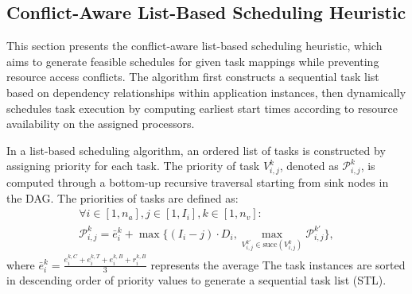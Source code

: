 \documentclass{IEEEtaes}
\begin{document}
\subsection{Conflict-Aware List-Based Scheduling Heuristic}
\label{subsec:schedule}
This section presents the conflict-aware list-based scheduling heuristic, which aims to generate feasible schedules for given task mappings while preventing resource access conflicts. The algorithm first constructs a sequential task list based on dependency relationships within application instances, then dynamically schedules task execution by computing earliest start times according to resource availability on the assigned processors. 

In a list-based scheduling algorithm, an ordered list of tasks is constructed by assigning priority for each task. The priority of task $V_{i,j}^{k}$, denoted as $\mathcal{P}_{i,j}^{k}$, is computed through a bottom-up recursive traversal starting from sink nodes in the DAG. The priorities of tasks are defined as:
\begin{multline}
    \forall i\in[1,n_a],j\in[1,I_i],k\in[1,n_v]:\\ \mathcal{P}_{i,j}^{k}=\bar{e}_{i}^{k}+\max\bigg\{(I_i-j)\cdot D_i,\max\limits_{V_{i,j}^{k'}\in \text{succ}(V_{i,j}^{k})}\mathcal{P}_{i,j}^{k'}\bigg\},
\end{multline}
where $\bar{e}_{i}^{k}=\frac{e_{i}^{k,C}+e_{i}^{k,T}+e_{i}^{k,B}+r_{i}^{k,B}}{3}$ represents the average  The task instances are sorted in descending order of priority values to generate a sequential task list (STL).
\end{document}

